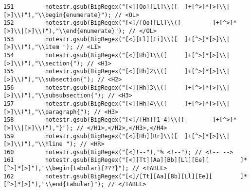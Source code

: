\begin{verbatim}
151         notestr.gsub(BigRegex("[<][Oo][Ll]\\([  ]+[^>]*[>]\\|[>]\\)"),"\\begin{enumerate}"); // <OL>
152         notestr.gsub(BigRegex("[<]/[Oo][Ll]\\([         ]+[^>]*[>]\\|[>]\\)"),"\\end{enumerate}"); // </OL>
153         notestr.gsub(BigRegex("[<][Ll][Ii]\\([  ]+[^>]*[>]\\|[>]\\)"),"\\item "); // <LI>
154         notestr.gsub(BigRegex("[<][Hh]1\\([     ]+[^>]*[>]\\|[>]\\)"),"\\section{"); // <H1>
155         notestr.gsub(BigRegex("[<][Hh]2\\([     ]+[^>]*[>]\\|[>]\\)"),"\\subsection{"); // <H2>
156         notestr.gsub(BigRegex("[<][Hh]3\\([     ]+[^>]*[>]\\|[>]\\)"),"\\subsubsection{"); // <H3>
157         notestr.gsub(BigRegex("[<][Hh]4\\([     ]+[^>]*[>]\\|[>]\\)"),"\\paragraph{"); // <H3>
158         notestr.gsub(BigRegex("[<]/[Hh][1-4]\\([        ]+[^>]*[>]\\|[>]\\)"),"}"); // </H1>,</H2>,</H3>,</H4>
159         notestr.gsub(BigRegex("[<][Hh][Rr]\\([  ]+[^>]*[>]\\|[>]\\)"),"\\hline "); // <HR>
160         notestr.gsub(BigRegex("[<]!--"),"% <!--"); // <!-- -->
161         notestr.gsub(BigRegex("[<][Tt][Aa][Bb][Ll][Ee][         ]*[^>]*[>]"),"\\begin{tabular}{???}"); // <TABLE>
162         notestr.gsub(BigRegex("[<]/[Tt][Aa][Bb][Ll][Ee][        ]*[^>]*[>]"),"\\end{tabular}"); // </TABLE>

\end{verbatim}
